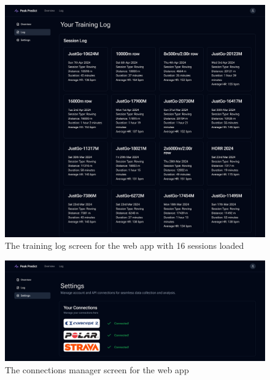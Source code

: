 \begin{figure}[!hp]
  \centering
  \includegraphics[width=\textwidth]{figures/fyp_training_log.png}
  \captionsetup{justification=centering}
  \caption*{The training log screen for the web app with 16 sessions loaded} \label{fig:app_webapp_training_log}
\end{figure}
\begin{figure}[!hp]
  \centering
  \includegraphics[width=\textwidth]{figures/fyp_connections_page.png}
  \captionsetup{justification=centering}
  \caption*{\label{fig:app_webapp_connection_mgr}The connections manager screen for the web app} 
\end{figure}

\newpage
